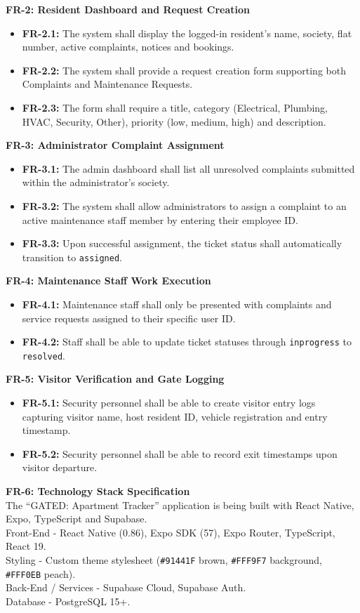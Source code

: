 \documentclass[a4paper,10pt]{scrartcl}
\numberwithin{figure}{section}
\newcommand{\code}[1]{\texttt{\renewcommand{\_}{\textunderscore\hspace{0pt}}#1}}
\begin{document}
\textbf{FR-2: Resident Dashboard and Request Creation}
\begin{itemize}
\item \textbf{FR-2.1:} The system shall display the logged-in resident's name, society, flat number, active complaints, notices and bookings.
\item \textbf{FR-2.2:} The system shall provide a request creation form supporting both Complaints and Maintenance Requests.
\item \textbf{FR-2.3:} The form shall require a title, category (Electrical, Plumbing, HVAC, Security, Other), priority (low, medium, high) and description.
\end{itemize}

\textbf{FR-3: Administrator Complaint Assignment}
\begin{itemize}
\item \textbf{FR-3.1:} The admin dashboard shall list all unresolved complaints submitted within the administrator's society.
\item \textbf{FR-3.2:} The system shall allow administrators to assign a complaint to an active maintenance staff member by entering their employee ID.
\item \textbf{FR-3.3:} Upon successful assignment, the ticket status shall automatically transition to \code{assigned}.
\end{itemize}

\textbf{FR-4: Maintenance Staff Work Execution}
\begin{itemize}
\item \textbf{FR-4.1:} Maintenance staff shall only be presented with complaints and service requests assigned to their specific user ID.
\item \textbf{FR-4.2:} Staff shall be able to update ticket statuses through \code{in\_progress} to \code{resolved}.
\end{itemize}

\textbf{FR-5: Visitor Verification and Gate Logging}
\begin{itemize}
\item \textbf{FR-5.1:} Security personnel shall be able to create visitor entry logs capturing visitor name, host resident ID, vehicle registration and entry timestamp.
\item \textbf{FR-5.2:} Security personnel shall be able to record exit timestamps upon visitor departure.
\end{itemize}

\textbf{FR-6: Technology Stack Specification}\\
The ``GATED: Apartment Tracker'' application is being built with React Native, Expo, TypeScript and Supabase.\\
Front-End - React Native (0.86), Expo SDK (57), Expo Router, TypeScript, React 19.\\
Styling - Custom theme stylesheet (\code{\#91441F} brown, \code{\#FFF9F7} background, \code{\#FFF0EB} peach).\\
Back-End / Services - Supabase Cloud, Supabase Auth.\\
Database - PostgreSQL 15+.
\end{document}
